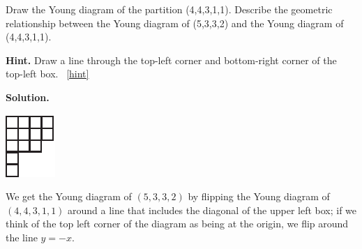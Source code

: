 \documentclass{book}
\begin{document}
\setcounter{project}{303}
\addtocounter{project}{-1}
\begin{activity}[]\label{activity-296}
\hypertarget{p-1527}{}%
Draw the Young diagram of the partition (4,4,3,1,1). Describe the geometric relationship between the Young diagram of (5,3,3,2) and the Young diagram of (4,4,3,1,1).%
\par\smallskip%
\noindent\textbf{Hint.}\hypertarget{hint-189}{}\quad%
\hypertarget{p-1528}{}%
Draw a line through the top-left corner and bottom-right corner of the top-left box.%
~\hfill{\tiny\hyperlink{a-303}{[hint]}\hypertarget{q-303}{}}\par\smallskip%
\noindent\textbf{Solution.}\hypertarget{solution-201}{}\quad%
\begin{sidebyside}{1}{0.42}{0.42}{0}
\begin{sbspanel}{0.16}
\includegraphics[width=1\linewidth]{images/Young44311}
\end{sbspanel}
\end{sidebyside}
\par
\hypertarget{p-1529}{}%
We get the Young diagram of \((5,3,3,2)\) by flipping the Young diagram of \((4,4,3,1,1)\) around a line that includes the diagonal of the upper left box; if we think of the top left corner of the diagram as being at the origin, we flip around the line \(y=-x\).%
\end{activity}
\end{document}
